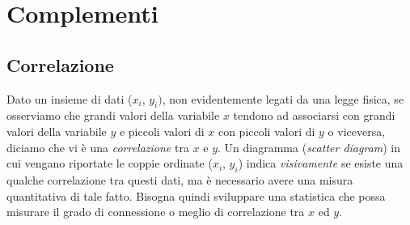 \chapter{Complementi}
\mt

\section{Correlazione}
\label{sec:Correlazione}

 Dato un insieme di dati ($x_i$, $y_i)$, non evidentemente
legati da una legge fisica, se osserviamo che grandi valori della variabile
$x$ tendono ad associarsi con grandi valori della variabile $y$ e piccoli
valori di $x$ con piccoli valori di $y$ o viceversa, diciamo che vi \`e una
{\itshape correlazione} tra $x$ e $y$.
Un diagramma ({\itshape scatter diagram}) in cui vengano riportate
le coppie ordinate ($x_i$, $y_i$) indica {\itshape visivamente} se esiste
una qualche correlazione tra questi dati, ma \`e necessario avere una
misura quantitativa di tale fatto.
Bisogna quindi sviluppare una statistica che possa misurare il grado di
connessione o meglio di correlazione tra $x$ ed $y$.

